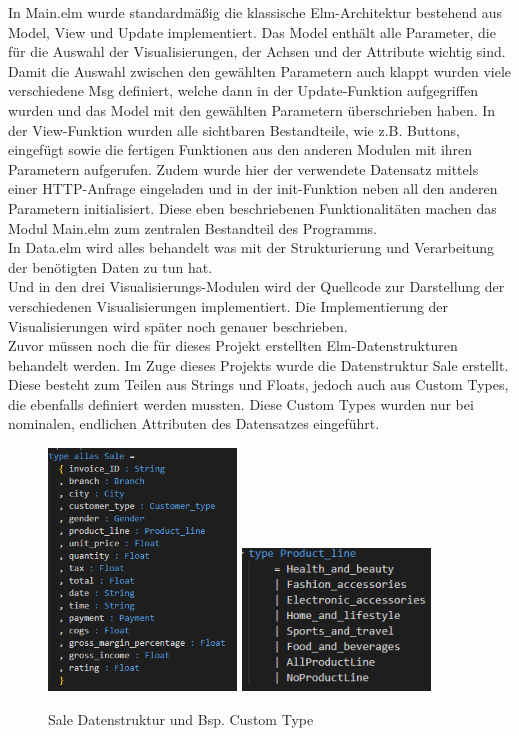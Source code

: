 \documentclass[usegeometry=true]{scrartcl}
\begin{document}
\noindent In Main.elm wurde standardmäßig die klassische Elm-Architektur bestehend aus Model, View und Update implementiert. Das Model enthält alle Parameter, die für die Auswahl der
Visualisierungen, der Achsen und der Attribute wichtig sind. Damit die Auswahl zwischen den gewählten Parametern auch klappt wurden viele verschiedene Msg definiert, welche dann
in der Update-Funktion aufgegriffen wurden und das Model mit den gewählten Parametern überschrieben haben. In der View-Funktion wurden alle sichtbaren Bestandteile, wie z.B.
Buttons, eingefügt sowie die fertigen Funktionen aus den anderen Modulen mit ihren Parametern aufgerufen. Zudem wurde hier der verwendete Datensatz mittels einer HTTP-Anfrage
eingeladen und in der init-Funktion neben all den anderen Parametern initialisiert. Diese eben beschriebenen Funktionalitäten machen das Modul Main.elm zum zentralen
Bestandteil des Programms.\\
In Data.elm wird alles behandelt was mit der Strukturierung und Verarbeitung der benötigten Daten zu tun hat.\\ Und in den drei Visualisierungs-Modulen
wird der Quellcode zur Darstellung der verschiedenen Visualisierungen implementiert. Die Implementierung der Visualisierungen wird später noch genauer beschrieben.\\
Zuvor müssen noch die für dieses Projekt erstellten Elm-Datenstrukturen behandelt werden. Im Zuge dieses Projekts wurde die Datenstruktur Sale erstellt. Diese besteht zum Teilen
aus Strings und Floats, jedoch auch aus Custom Types, die ebenfalls definiert werden mussten. Diese Custom Types wurden nur bei nominalen, endlichen Attributen des Datensatzes
eingeführt.

\begin{figure} [H]
	\begin{center}
		\includegraphics[width=5cm]{IMG/SaleDatenstruktur}
		\includegraphics[width=5cm]{IMG/ProductLine}
		\caption{Sale Datenstruktur und Bsp. Custom Type}
		\label{fig:Sale}
	\end{center}
\end{figure}
\end{document}
